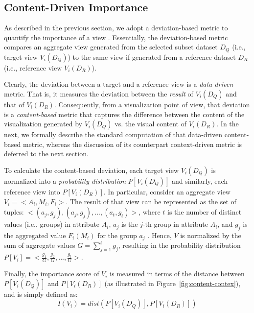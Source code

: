 \subsection{Content-Driven Importance}
\label{subsec:content_driven_deviation}

As  described in the previous section, we adopt a deviation-based metric to quantify the importance of a view \cite{Vartak2015,Vartak2014}. 
%
Essentially, the deviation-based metric compares an aggregate view generated from the selected subset dataset $D_Q$ (i.e., target view $V_i(D_Q)$) to the same view if generated from a reference dataset $D_R$ (i.e., reference view $V_i(D_R)$). 
%
%

Clearly, the deviation between a target and a reference view is a {\em data-driven} metric. 
%
That is, it measures the deviation between the {\em result} of $V_i(D_Q)$ and that of $V_i(D_R)$. 
%
Consequently, from a visualization point of view, that deviation is a {\em content-based} metric that captures the difference between the content of the visualization generated by $V_i(D_Q)$ vs. the visual content of  $V_i(D_R)$.
%
In the next, we formally describe the standard computation of that data-driven content-based metric, whereas the discussion of its counterpart context-driven metric is deferred to the next section.

To calculate the content-based deviation, each target view $V_i(D_Q)$ is normalized into a {\em probability distribution} $P[V_i(D_Q)]$ and similarly, each reference view into $P[V_i(D_R)]$.
%
In particular, consider an aggregate view $V_i=<\!A_i,M_i,F_i\!>$. 
%
The result of that view can be represented as the set of tuples: $<\!(a_j, g_j), (a_j, g_j), ..., (a_t, g_t)\!>$, where $t$ is the number of distinct values (i.e., groups) in attribute $A_i$, $a_j$ is the $j$-th group in attribute $A_i$, and $g_j$ is the aggregated value $F_i(M_i)$ for the group $a_j$ \cite{Ehsan2016, Vartak2015}. 
%
Hence, $V$ is normalized by the sum of aggregate values $G=\sum\limits_{j=1}^{t} g_j$, resulting in the probability distribution $P[V_i] = <\!\frac{g_1}{G}, \frac{g_2}{G}, ..., \frac{g_t}{G}\!>$.
%

Finally, the importance score of $V_i$ is measured in terms of the distance between $P[V_i(D_Q)]$ and $P[V_i(D_R)]$ (as illustrated in Figure~\ref{fig:content-contex}), and is simply defined as:
\begin{equation}
	I\left(V_i\right) = dist\left(P\left[V_i(D_Q)\right], P\left[V_i(D_R)\right]\right)
	\label{importance_score}
\end{equation}

